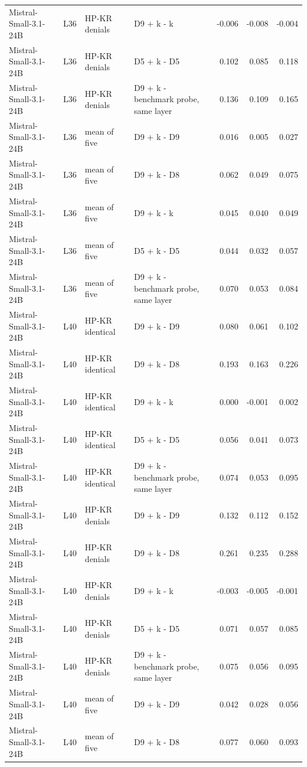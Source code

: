 \begin{table}
\begin{tabular}{llllrrr}
Mistral-Small-3.1-24B & L36 & HP-KR denials & D9 + k - k & -0.006 & -0.008 & -0.004 \\
Mistral-Small-3.1-24B & L36 & HP-KR denials & D5 + k - D5 & 0.102 & 0.085 & 0.118 \\
Mistral-Small-3.1-24B & L36 & HP-KR denials & D9 + k - benchmark probe, same layer & 0.136 & 0.109 & 0.165 \\
Mistral-Small-3.1-24B & L36 & mean of five & D9 + k - D9 & 0.016 & 0.005 & 0.027 \\
Mistral-Small-3.1-24B & L36 & mean of five & D9 + k - D8 & 0.062 & 0.049 & 0.075 \\
Mistral-Small-3.1-24B & L36 & mean of five & D9 + k - k & 0.045 & 0.040 & 0.049 \\
Mistral-Small-3.1-24B & L36 & mean of five & D5 + k - D5 & 0.044 & 0.032 & 0.057 \\
Mistral-Small-3.1-24B & L36 & mean of five & D9 + k - benchmark probe, same layer & 0.070 & 0.053 & 0.084 \\
Mistral-Small-3.1-24B & L40 & HP-KR identical & D9 + k - D9 & 0.080 & 0.061 & 0.102 \\
Mistral-Small-3.1-24B & L40 & HP-KR identical & D9 + k - D8 & 0.193 & 0.163 & 0.226 \\
Mistral-Small-3.1-24B & L40 & HP-KR identical & D9 + k - k & 0.000 & -0.001 & 0.002 \\
Mistral-Small-3.1-24B & L40 & HP-KR identical & D5 + k - D5 & 0.056 & 0.041 & 0.073 \\
Mistral-Small-3.1-24B & L40 & HP-KR identical & D9 + k - benchmark probe, same layer & 0.074 & 0.053 & 0.095 \\
Mistral-Small-3.1-24B & L40 & HP-KR denials & D9 + k - D9 & 0.132 & 0.112 & 0.152 \\
Mistral-Small-3.1-24B & L40 & HP-KR denials & D9 + k - D8 & 0.261 & 0.235 & 0.288 \\
Mistral-Small-3.1-24B & L40 & HP-KR denials & D9 + k - k & -0.003 & -0.005 & -0.001 \\
Mistral-Small-3.1-24B & L40 & HP-KR denials & D5 + k - D5 & 0.071 & 0.057 & 0.085 \\
Mistral-Small-3.1-24B & L40 & HP-KR denials & D9 + k - benchmark probe, same layer & 0.075 & 0.056 & 0.095 \\
Mistral-Small-3.1-24B & L40 & mean of five & D9 + k - D9 & 0.042 & 0.028 & 0.056 \\
Mistral-Small-3.1-24B & L40 & mean of five & D9 + k - D8 & 0.077 & 0.060 & 0.093 \\

\end{tabular}
\end{table}
